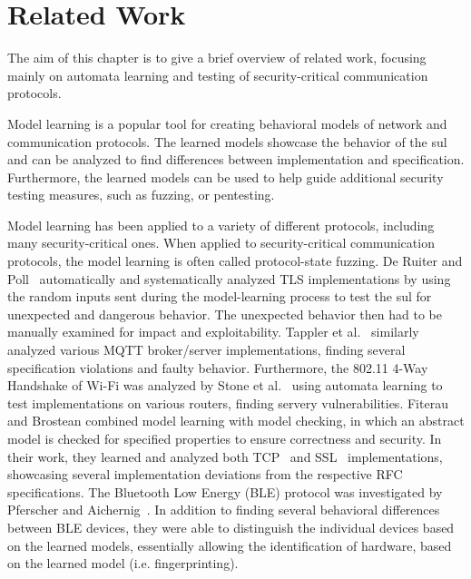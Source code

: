 %
%
% 
% 
% 

\chapter{Related Work}

\label{chap:Related}
The aim of this chapter is to give a brief overview of related work, focusing mainly on automata learning and testing of security-critical communication protocols.

Model learning is a popular tool for creating behavioral models of network and communication protocols. The learned models showcase the behavior of the \ac{sul} and can be analyzed to find differences between implementation and specification. Furthermore, the learned models can be used to help guide additional security testing measures, such as fuzzing, or pentesting. 

Model learning has been applied to a variety of different protocols, including many security-critical ones. When applied to security-critical communication protocols, the model learning is often called protocol-state fuzzing. De Ruiter and Poll~\cite{DBLP:conf/uss/RuiterP15} automatically and systematically analyzed TLS implementations by using the random inputs sent during the model-learning process to test the \ac{sul} for unexpected and dangerous behavior. The unexpected behavior then had to be manually examined for impact and exploitability. Tappler et al.~\cite{DBLP:conf/icst/TapplerAB17} similarly analyzed various MQTT broker/server implementations, finding several specification violations and faulty behavior. Furthermore, the 802.11 4-Way Handshake of Wi-Fi was analyzed by Stone et al.~\cite{DBLP:conf/esorics/StoneCR18} using automata learning to test implementations on various routers, finding servery vulnerabilities.
Fiterau and Brostean combined model learning with model checking, in which an abstract model is checked for specified properties to ensure correctness and security. In their work, they learned and analyzed both TCP~\cite{DBLP:conf/cav/Fiterau-Brostean16} and SSL~\cite{DBLP:conf/spin/Fiterau-Brostean17} implementations, showcasing several implementation deviations from the respective RFC specifications.
The Bluetooth Low Energy (BLE) protocol was investigated by Pferscher and Aichernig~\cite{pferscher2021fingerprinting}. In addition to finding several behavioral differences between BLE devices, they were able to distinguish the individual devices based on the learned models, essentially allowing the identification of hardware, based on the learned model (i.e. fingerprinting).

